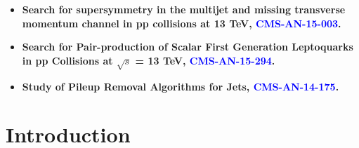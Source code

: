 \begin{titlepage}
\begin{itemize}
\item{\bf Search for supersymmetry in the multijet and missing transverse momentum channel in pp collisions at 13 TeV, \textcolor{blue}{CMS-AN-15-003}. }

\item{\bf Search for Pair-production of Scalar First Generation
Leptoquarks in pp Collisions at $\sqrt{s}$ = 13 TeV, \textcolor{blue}{CMS-AN-15-294}. }

\item{\bf Study of Pileup Removal Algorithms for Jets, \textcolor{blue}{CMS-AN-14-175}.}

\end{itemize}





 

\vfill %

\end{titlepage}






\tableofcontents


\newpage



\section{Introduction}

